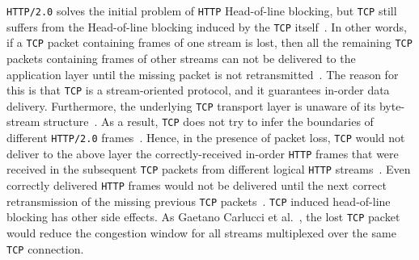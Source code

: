 \documentclass[12pt,a4paper,twoside,openright]{report}
\begin{document}
    
    
    
    


\texttt{HTTP/2.0} solves the initial problem of \texttt{HTTP} Head-of-line blocking, but \texttt{TCP} still suffers from the Head-of-line blocking induced by the \texttt{TCP} itself~\cite{bib_making_web_faster_with_http2, bib_TCP_Head_of_line_blocking_stackoverflow, How-does-HTTP-2-solve-the-Head-of-Line-blocking-HOL-issue, head-of-line-blocking-in-quic-and-http-3-the-details}.
In other words, if a \texttt{TCP} packet containing frames of one stream is lost, then all the remaining \texttt{TCP} packets containing frames of other streams can not be delivered to the application layer until the missing packet is not retransmitted~\cite{bib_making_web_faster_with_http2, bib_TCP_Head_of_line_blocking_stackoverflow, How-does-HTTP-2-solve-the-Head-of-Line-blocking-HOL-issue}.
The reason for this is that \texttt{TCP} is a stream-oriented protocol, and it guarantees in-order data delivery.
Furthermore, the underlying \texttt{TCP} transport layer is unaware of its byte-stream structure~\cite{head-of-line-blocking-in-quic-and-http-3-the-details}.
As a result, \texttt{TCP} does not try to infer the boundaries of different \texttt{HTTP/2.0} frames~\cite{head-of-line-blocking-in-quic-and-http-3-the-details}.
Hence, in the presence of packet loss, \texttt{TCP} would not deliver to the above layer the correctly-received in-order \texttt{HTTP} frames that were received in the subsequent \texttt{TCP} packets from different logical \texttt{HTTP} streams~\cite{head-of-line-blocking-in-quic-and-http-3-the-details}.
Even correctly delivered \texttt{HTTP} frames would not be delivered until the next correct retransmission of the missing previous \texttt{TCP} packets~\cite{head-of-line-blocking-in-quic-and-http-3-the-details}.
\texttt{TCP} induced head-of-line blocking has other side effects.
As Gaetano Carlucci et al.~\cite{HTTP_over_UDP_An_Experimental_Investigation_of_QUIC}, the lost \texttt{TCP} packet would reduce the congestion window for all streams multiplexed over the same \texttt{TCP} connection.



\end{document}
